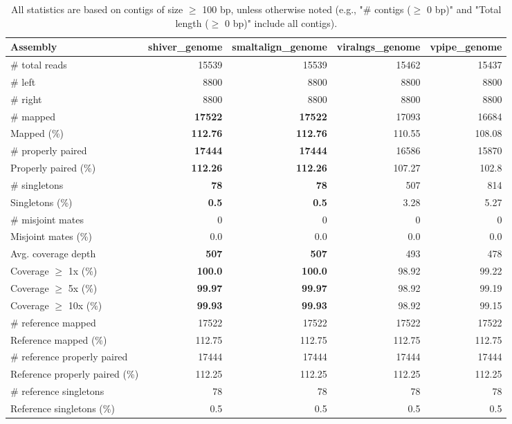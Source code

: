 \documentclass[12pt,a4paper]{article}
\begin{document}
\begin{table}[ht]
\begin{center}
\caption{All statistics are based on contigs of size $\geq$ 100 bp, unless otherwise noted (e.g., "\# contigs ($\geq$ 0 bp)" and "Total length ($\geq$ 0 bp)" include all contigs).}
\begin{tabular}{|l*{4}{|r}|}
\hline
Assembly & shiver\_genome & smaltalign\_genome & viralngs\_genome & vpipe\_genome \\ \hline
\# total reads & 15539 & 15539 & 15462 & 15437 \\ \hline
\# left & 8800 & 8800 & 8800 & 8800 \\ \hline
\# right & 8800 & 8800 & 8800 & 8800 \\ \hline
\# mapped & {\bf 17522} & {\bf 17522} & 17093 & 16684 \\ \hline
Mapped (\%) & {\bf 112.76} & {\bf 112.76} & 110.55 & 108.08 \\ \hline
\# properly paired & {\bf 17444} & {\bf 17444} & 16586 & 15870 \\ \hline
Properly paired (\%) & {\bf 112.26} & {\bf 112.26} & 107.27 & 102.8 \\ \hline
\# singletons & {\bf 78} & {\bf 78} & 507 & 814 \\ \hline
Singletons (\%) & {\bf 0.5} & {\bf 0.5} & 3.28 & 5.27 \\ \hline
\# misjoint mates & 0 & 0 & 0 & 0 \\ \hline
Misjoint mates (\%) & 0.0 & 0.0 & 0.0 & 0.0 \\ \hline
Avg. coverage depth & {\bf 507} & {\bf 507} & 493 & 478 \\ \hline
Coverage $\geq$ 1x (\%) & {\bf 100.0} & {\bf 100.0} & 98.92 & 99.22 \\ \hline
Coverage $\geq$ 5x (\%) & {\bf 99.97} & {\bf 99.97} & 98.92 & 99.19 \\ \hline
Coverage $\geq$ 10x (\%) & {\bf 99.93} & {\bf 99.93} & 98.92 & 99.15 \\ \hline
\# reference mapped & 17522 & 17522 & 17522 & 17522 \\ \hline
Reference mapped (\%) & 112.75 & 112.75 & 112.75 & 112.75 \\ \hline
\# reference properly paired & 17444 & 17444 & 17444 & 17444 \\ \hline
Reference properly paired (\%) & 112.25 & 112.25 & 112.25 & 112.25 \\ \hline
\# reference singletons & 78 & 78 & 78 & 78 \\ \hline
Reference singletons (\%) & 0.5 & 0.5 & 0.5 & 0.5 \\ \hline

\end{tabular}
\end{center}
\end{table}
\end{document}
